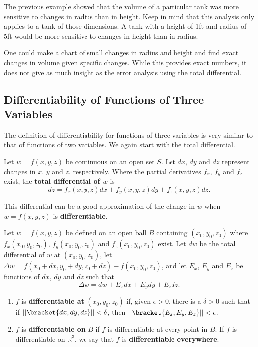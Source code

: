 The previous example showed that the volume of a particular tank was more sensitive to changes in radius than in height. Keep in mind that this analysis only applies to a tank of those dimensions. A tank with a height of 1ft and radius of 5ft would be more sensitive to changes in height than in radius.

One could make a chart of small changes in radius and height and find exact changes in volume given specific changes. While this provides exact numbers, it does not give as much insight as the error analysis using the total differential.

\subsection*{Differentiability of Functions of Three Variables}

The definition of differentiability for functions of three variables is very similar to that of functions of two variables. We again start with the total differential.

{Let $w=f(x,y,z)$ be continuous on an open set $S$. Let $dx$, $dy$ and $dz$ represent changes in $x$, $y$ and  $z$, respectively. Where the partial derivatives $f_x$, $f_y$ and $f_z$ exist, the \textbf{total differential of $w$} is
$$dz = f_x(x,y,z)dx + f_y(x,y,z)dy+f_z(x,y,z)dz.$$
}

This differential can be a good approximation of the change in $w$ when $w = f(x,y,z)$ is \textbf{differentiable}.

{Let $w=f(x,y,z)$ be defined on an open ball $B$ containing $(x_0,y_0,z_0)$ where $f_x(x_0,y_0,z_0)$, $f_y(x_0,y_0,z_0)$ and $f_z(x_0,y_0,z_0)$ exist. Let $dw$ be the total differential of $w$ at $(x_0,y_0,z_0)$, let $\Delta w = f(x_0+dx,y_0+dy,z_0+dz) - f(x_0,y_0,z_0)$, and let $E_x$, $E_y$ and $E_z$ be functions of $dx$, $dy$ and $dz$  such that
$$\Delta w = dw + E_xdx + E_ydy + E_zdz.$$
\begin{enumerate}
	\item $f$ is \textbf{differentiable at $(x_0,y_0,z_0)$} if, given $\epsilon >0$, there is a $\delta >0$ such that if $||\bracket{dx,dy,dz}|| < \delta$, then $||\bracket{E_x,E_y,E_z}|| < \epsilon$. 
	\item	$f$ is \textbf{differentiable on $B$} if $f$ is differentiable at every point in $B$. If $f$ is differentiable on $\mathbb{R}^3$, we say that $f$ is \textbf{differentiable everywhere}.
\end{enumerate}}

